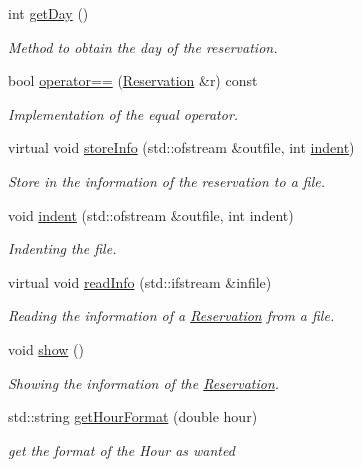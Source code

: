 \begin{DoxyCompactItemize}
int \mbox{\hyperlink{class_reservation_a22d66f6cc7532b775d5a05338ad6b196}{get\+Day}} ()
\begin{DoxyCompactList}\small\item\em Method to obtain the day of the reservation. \end{DoxyCompactList}\item 
bool \mbox{\hyperlink{class_reservation_ae033fc48c694b375e0cc68215f7dcfdb}{operator==}} (\mbox{\hyperlink{class_reservation}{Reservation}} \&r) const
\begin{DoxyCompactList}\small\item\em Implementation of the equal operator. \end{DoxyCompactList}\item 
virtual void \mbox{\hyperlink{class_reservation_a8ec83fe2eb15294c3a51a9998ed17df7}{store\+Info}} (std\+::ofstream \&outfile, int \mbox{\hyperlink{class_reservation_a480981ed050bae19bc74bbb0bbb459f9}{indent}})
\begin{DoxyCompactList}\small\item\em Store in the information of the reservation to a file. \end{DoxyCompactList}\item 
void \mbox{\hyperlink{class_reservation_a480981ed050bae19bc74bbb0bbb459f9}{indent}} (std\+::ofstream \&outfile, int indent)
\begin{DoxyCompactList}\small\item\em Indenting the file. \end{DoxyCompactList}\item 
virtual void \mbox{\hyperlink{class_reservation_acff32024a350c2156af9f74522c59b7b}{read\+Info}} (std\+::ifstream \&infile)
\begin{DoxyCompactList}\small\item\em Reading the information of a \mbox{\hyperlink{class_reservation}{Reservation}} from a file. \end{DoxyCompactList}\item 
\mbox{\label{class_reservation_a16fb0d030a178a997adef3f439665723}} 
void \mbox{\hyperlink{class_reservation_a16fb0d030a178a997adef3f439665723}{show}} ()
\begin{DoxyCompactList}\small\item\em Showing the information of the \mbox{\hyperlink{class_reservation}{Reservation}}. \end{DoxyCompactList}\item 
std\+::string \mbox{\hyperlink{class_reservation_a36aa0b30371103b07aa331b33e6109d1}{get\+Hour\+Format}} (double hour)
\begin{DoxyCompactList}\small\item\em get the format of the Hour as wanted \end{DoxyCompactList}\end{DoxyCompactItemize}
